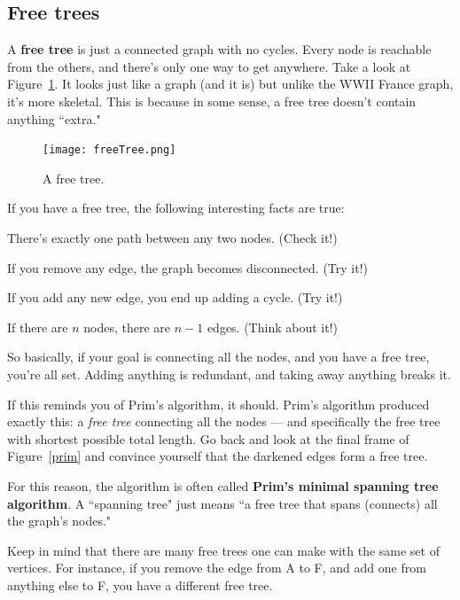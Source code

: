 \subsection{Free trees}

A \textbf{free tree} is just a connected graph with no cycles. Every node
is reachable from the others, and there's only one way to get anywhere.
Take a look at Figure~\ref{freetree}. It looks just like a graph (and it
is) but unlike the WWII France graph, it's more skeletal. This is because
in some sense, a free tree doesn't contain anything ``extra."

\begin{figure}[ht]
\centering
\begin{custommargins}{-2.1cm}{-3cm}
\texttt{[image: freeTree.png]}
\caption{A free tree.}
\label{freetree}
\end{custommargins}
\end{figure}

If you have a free tree, the following interesting facts are true:

\begin{compactenum}
\item There's exactly one path between any two nodes. (Check it!)
\item If you remove any edge, the graph becomes disconnected. (Try it!)
\item If you add any new edge, you end up adding a cycle. (Try it!)
\item \label{onelessedge} If there are $n$ nodes, there are $n-1$ edges. (Think about it!)
\end{compactenum}

So basically, if your goal is connecting all the nodes, and you have a free
tree, you're all set. Adding anything is redundant, and taking away
anything breaks it.

If this reminds you of Prim's algorithm, it should. Prim's algorithm
produced exactly this: a \textit{free tree} connecting all the nodes ---
and specifically the free tree with shortest possible total length. Go back
and look at the final frame of Figure~\ref{prim} and convince yourself that
the darkened edges form a free tree.

For this reason, the algorithm is often called \textbf{Prim's minimal
spanning tree algorithm}. A ``spanning tree" just means ``a free tree that
spans (connects) all the graph's nodes." 

Keep in mind that there are many free trees one can make with the same set
of vertices. For instance, if you remove the edge from A to F, and add one
from anything else to F, you have a different free tree.

